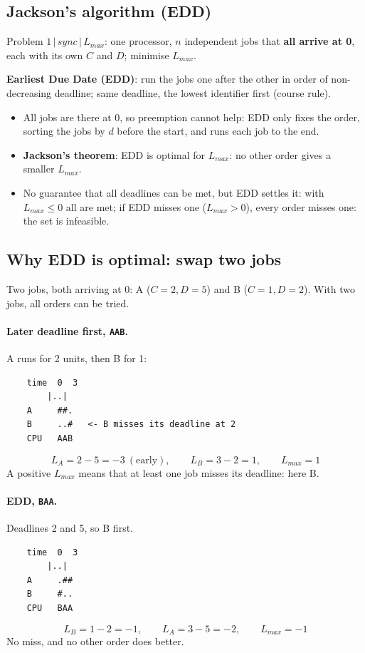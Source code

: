 \subsection{Jackson's algorithm (EDD)}
Problem $1 \,|\, \textit{sync} \,|\, L_{max}$: one processor, $n$ independent jobs that \textbf{all arrive at 0}, each with its own $C$ and $D$; minimise $L_{max}$.

\textbf{Earliest Due Date (EDD)}: run the jobs one after the other in order of non-decreasing deadline; same deadline, the lowest identifier first (course rule).
\begin{itemize}
    \item All jobs are there at 0, so preemption cannot help: EDD only fixes the order, sorting the jobs by $d$ before the start, and runs each job to the end.
    \item \textbf{Jackson's theorem}: EDD is optimal for $L_{max}$: no other order gives a smaller $L_{max}$.
    \item No guarantee that all deadlines can be met, but EDD settles it: with $L_{max} \le 0$ all are met; if EDD misses one ($L_{max} > 0$), every order misses one: the set is infeasible.
\end{itemize}

\subsection{Why EDD is optimal: swap two jobs}
Two jobs, both arriving at 0: A ($C = 2, D = 5$) and B ($C = 1, D = 2$). With two jobs, all orders can be tried.

\paragraph{Later deadline first, \texttt{AAB}.} A runs for 2 units, then B for 1:
\begin{verbatim}
    time  0  3
        |..|
    A     ##.
    B     ..#   <- B misses its deadline at 2
    CPU   AAB
\end{verbatim}
\[
L_A = 2 - 5 = -3 \ (\text{early}), \qquad L_B = 3 - 2 = 1, \qquad L_{max} = 1
\]
A positive $L_{max}$ means that at least one job misses its deadline: here B.

\paragraph{EDD, \texttt{BAA}.} Deadlines 2 and 5, so B first.
\begin{verbatim}
    time  0  3
        |..|
    A     .##
    B     #..
    CPU   BAA
\end{verbatim}
\[
L_B = 1 - 2 = -1, \qquad L_A = 3 - 5 = -2, \qquad L_{max} = -1
\]
No miss, and no other order does better.

